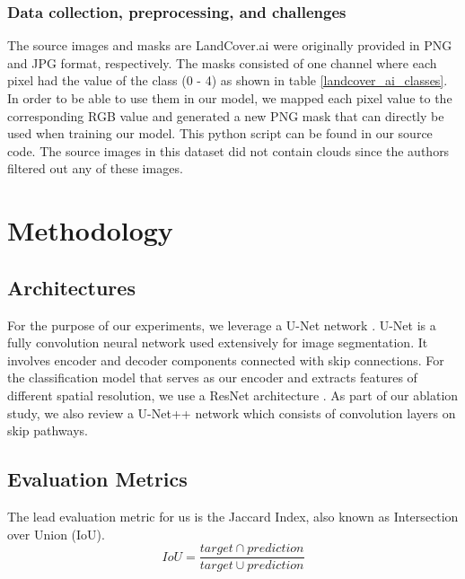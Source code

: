 \documentclass[conference]{IEEEtran}
\begin{document}
\subsubsection{Data collection, preprocessing, and challenges}
The source images and masks are LandCover.ai were originally provided in PNG and JPG format, respectively. The masks consisted of one channel where each pixel had the value of the class (0 - 4) as shown in table \ref{landcover_ai_classes}. In order to be able to use them in our model, we mapped each pixel value to the corresponding RGB value and generated a new PNG mask that can directly be used when training our model. This python script can be found in our source code. The source images  in this dataset did not contain clouds since the authors \cite{DBLP:journals/corr/abs-2005-02264} filtered out any of these images. 



\section{Methodology}
\subsection{Architectures}

For the purpose of our experiments, we leverage a U-Net network \cite{ronneberger2015unet}. U-Net is a fully convolution neural network used extensively for image segmentation. It involves encoder and decoder components connected with skip connections. For the classification model that serves as our encoder and extracts features of different spatial resolution, we use a ResNet architecture \cite{DBLP:journals/corr/HeZRS15}. As part of our ablation study, we also review a U-Net++ network \cite{DBLP:journals/corr/abs-1807-10165} which consists of convolution layers on skip pathways.

\subsection{Evaluation Metrics}
 The lead evaluation metric for us is the Jaccard Index, also known as Intersection over Union (IoU).
\begin{equation*}
    IoU=\frac{target \cap prediction}{target \cup prediction}
\end{equation*}
\end{document}
